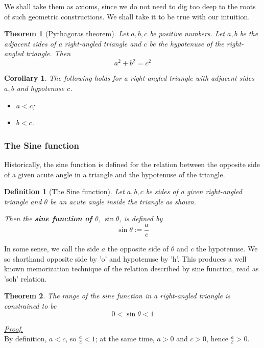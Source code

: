 \documentclass[12pt]{article}
\newtheorem{definition}{Definition}[section]
\newtheorem*{theorem}{Theorem}
\newtheorem*{corollary}{Corollary}
\renewenvironment{proof}[1][Proof]{\begin{snugshade*} \underline{\textit{{#1}.}}\\}{\hfill \qedsymbol \end{snugshade*}}
\begin{document}
    We shall take them as axioms, since we do not need to dig too deep to the roots of such geometric constructions. We shall take it to be true with our intuition.

    \begin{theorem}[Pythagoras theorem]
        Let $a,b,c$ be positive numbers. Let $a,b$ be the adjacent sides of a right-angled triangle and $c$ be the hypotenuse of the right-angled triangle. Then $$a^2+b^2=c^2$$
    \end{theorem}

    \begin{corollary}
        The following holds for a right-angled triangle with adjacent sides $a,b$ and hypotenuse $c$.
        \begin{itemize}
            \item $a<c$;
            \item $b<c$.
        \end{itemize}
    \end{corollary}

    \subsubsection*{The Sine function}

    Historically, the sine function is defined for the relation between the opposite side of a given acute angle in a triangle and the hypotenuse of the triangle.

    \begin{definition}[The Sine function]
        Let $a,b,c$ be sides of a given right-angled triangle and $\theta$ be an acute angle inside the triangle as shown.

        Then the \textbf{sine function of $\theta$}, $\sin{\theta}$, is defined by $$\sin{\theta}:=\frac{a}{c}$$
    \end{definition}

    In some sense, we call the side $a$ the opposite side of $\theta$ and $c$ the hypotenuse. We so shorthand opposite side by 'o' and hypotenuse by 'h'. This produces a well known memorization technique of the relation described by sine function, read as 'soh' relation.

    \begin{theorem}
        The range of the sine function in a right-angled triangle is constrained to be $$0<\sin{\theta}<1$$
    \end{theorem}

    \begin{proof}
        By definition, $a<c$, so $\frac{a}{c}<1$; at the same time, $a>0$ and $c>0$, hence $\frac{a}{c}>0$.
    \end{proof}
\end{document}

